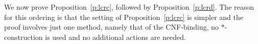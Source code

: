 


We now prove Proposition~\ref{p:lcrc}, followed by Proposition~\ref{p:lcrd}. The reason
for this ordering is that the setting of Proposition~\ref{p:lcrc} is simpler and the
proof involves just one method, namely that of the CNF-binding, 
no $*$-construction is used and no additional actions are needed.


